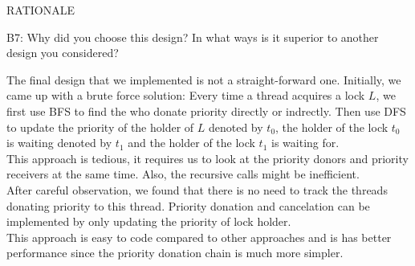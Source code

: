 \begin{aspect}{RATIONALE}
	\begin{qc}
		B7: Why did you choose this design?  In what ways is it superior to another design you considered?
	\end{qc}
	The final design that we implemented is not a straight-forward one.
	Initially,
	we came up with a brute force solution: Every time a thread acquires a lock $L$,
	we first use BFS to find the who donate priority directly or indrectly.
	Then use DFS to update the priority of the holder of $L$ denoted by $t_0$,
	the holder of the lock $t_0$ is waiting denoted by $t_1$ and
	the holder of the lock $t_1$ is waiting for.\\

	This approach is tedious, it requires us to look at the priority donors and priority receivers at the same time.
	Also, the recursive calls might be inefficient.\\

	After careful observation, we found that there is no need to track the threads donating priority to this thread.
	Priority donation and cancelation can be implemented by only updating the priority of lock holder.\\
	This approach is easy to code compared to other approaches and is has better performance since the priority donation chain is much more simpler.
\end{aspect}
